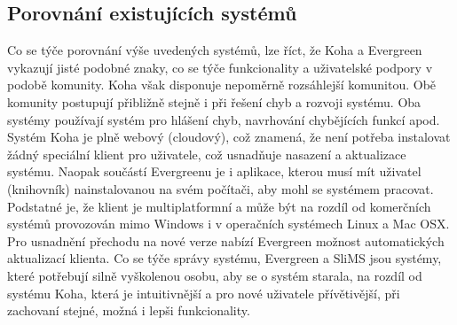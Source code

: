 \subsection{Porovnání existujících systémů}
Co se týče porovnání výše uvedených systémů, lze říct, že Koha a Evergreen
vykazují jisté podobné znaky, co se týče funkcionality a uživatelské podpory v
podobě komunity. Koha však disponuje nepoměrně rozsáhlejší komunitou. Obě
komunity postupují přibližně stejně i při řešení chyb a rozvoji systému. Oba
systémy používají systém pro hlášení chyb, navrhování chybějících funkcí apod.
Systém Koha je plně webový (cloudový), což znamená, že není potřeba instalovat
žádný speciální klient pro uživatele, což usnadňuje nasazení a aktualizace
systému. Naopak součástí Evergreenu je i aplikace, kterou musí mít uživatel
(knihovník) nainstalovanou na svém počítači, aby mohl se systémem pracovat.
Podstatné je, že klient je multiplatformní a může být na rozdíl od komerčních
systémů provozován mimo Windows i v operačních systémech Linux a Mac OSX. Pro
usnadnění přechodu na nové verze nabízí Evergreen možnost automatických
aktualizací klienta. Co se týče správy systému, Evergreen a SliMS jsou systémy,
které potřebují silně vyškolenou osobu, aby se o systém starala, na rozdíl od
systému Koha, která je intuitivnější a pro nové uživatele přívětivější, při
zachovaní stejné, možná i lepši funkcionality.
